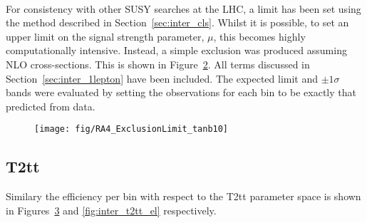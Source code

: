 \begin{figure}[h!]
\centering
{}
\\
\caption[]{}
\label{fig:inter_msugra_el}
\end{figure}

For consistency with other \ac{SUSY} searches at the \ac{LHC}, a limit has been
set using the \CLs method described in Section~\ref{sec:inter_cls}. Whilst it is
possible, to set an upper limit on the signal strength parameter, $\mu$, this
becomes highly computationally intensive. Instead, a simple exclusion was
produced assuming \ac{NLO} cross-sections. This is shown in
Figure~\ref{fig:inter_msugra_exclusion}. All terms discussed in
Section~\ref{sec:inter_1lepton} have been included. The expected limit and $\pm
1\sigma$ bands were evaluated by setting the observations for each bin to be
exactly that predicted from data.

\begin{figure}[h!]
\texttt{[image: fig/RA4\_ExclusionLimit\_tanb10]}
\caption[]{}
\label{fig:inter_msugra_exclusion}
\end{figure}

\subsection{\ac{T2tt}}
Similary the efficiency per \STlep bin with respect to the \ac{T2tt} parameter
space is shown in Figures~\ref{fig:inter_t2tt_mu} and \ref{fig:inter_t2tt_el}
respectively.
\begin{figure}
\centering
{}
\\
\caption[]{}
\label{fig:inter_t2tt_mu}
\end{figure}

